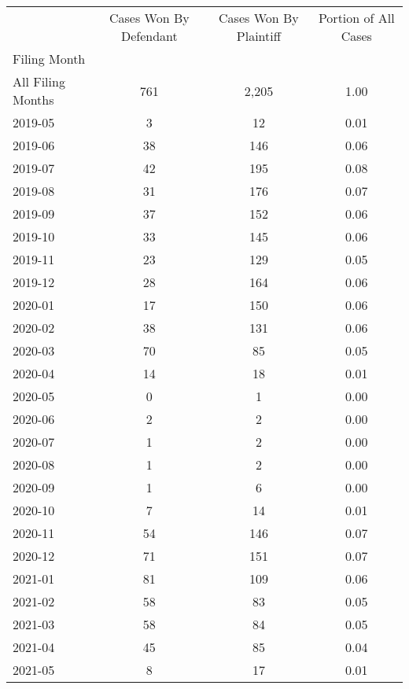 \begin{tabular}{lccc}
\toprule
 & Cases Won By Defendant & Cases Won By Plaintiff & Portion of All Cases \\
Filing Month &  &  &  \\
\midrule
All Filing Months & 761 & 2,205 & 1.00 \\
2019-05 & 3 & 12 & 0.01 \\
2019-06 & 38 & 146 & 0.06 \\
2019-07 & 42 & 195 & 0.08 \\
2019-08 & 31 & 176 & 0.07 \\
2019-09 & 37 & 152 & 0.06 \\
2019-10 & 33 & 145 & 0.06 \\
2019-11 & 23 & 129 & 0.05 \\
2019-12 & 28 & 164 & 0.06 \\
2020-01 & 17 & 150 & 0.06 \\
2020-02 & 38 & 131 & 0.06 \\
2020-03 & 70 & 85 & 0.05 \\
2020-04 & 14 & 18 & 0.01 \\
2020-05 & 0 & 1 & 0.00 \\
2020-06 & 2 & 2 & 0.00 \\
2020-07 & 1 & 2 & 0.00 \\
2020-08 & 1 & 2 & 0.00 \\
2020-09 & 1 & 6 & 0.00 \\
2020-10 & 7 & 14 & 0.01 \\
2020-11 & 54 & 146 & 0.07 \\
2020-12 & 71 & 151 & 0.07 \\
2021-01 & 81 & 109 & 0.06 \\
2021-02 & 58 & 83 & 0.05 \\
2021-03 & 58 & 84 & 0.05 \\
2021-04 & 45 & 85 & 0.04 \\
2021-05 & 8 & 17 & 0.01 \\
\bottomrule
\end{tabular}
